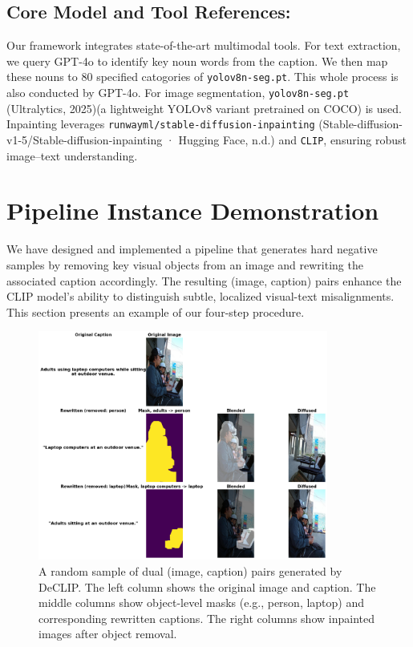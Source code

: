 \documentclass[11pt,letterpaper]{article}
\begin{document}
\subsection{Core Model and Tool References:}
Our framework integrates state-of-the-art multimodal tools. For text extraction, we query GPT-4o to identify key noun words from the caption. We then map these nouns to $80$ specified catogories of \texttt{yolov8n-seg.pt}. This whole process is also conducted by GPT-4o. For image segmentation, \texttt{yolov8n-seg.pt} \cite{ultralytics2023segment} (Ultralytics, 2025)(a lightweight YOLOv8 variant pretrained on COCO) is used.\\ Inpainting leverages \texttt{runwayml/stable-diffusion-inpainting} \cite{stabilityai2023inpainting}(Stable-diffusion-v1-5/Stable-diffusion-inpainting · Hugging Face, n.d.) and \texttt{CLIP}, ensuring robust image–text understanding.



\section{Pipeline Instance Demonstration}
We have designed and implemented a pipeline that generates hard negative samples by removing key visual objects from an image and rewriting the associated caption accordingly. The resulting (image, caption) pairs enhance the CLIP model’s ability to distinguish subtle, localized visual-text misalignments. This section presents an example of our four-step procedure.
\begin{figure}[h]
    \centering
    \includegraphics[width=0.85\textwidth]{final_report/assets/preliminary.png}
    \caption{{A random sample of dual (image, caption) pairs generated by DeCLIP. The left column shows the original image and caption. The middle columns show object-level masks (e.g., person, laptop) and corresponding rewritten captions. The right columns show inpainted images after object removal.}}
    \label{fig:preliminary_pipeline}
\end{figure}
\end{document}
